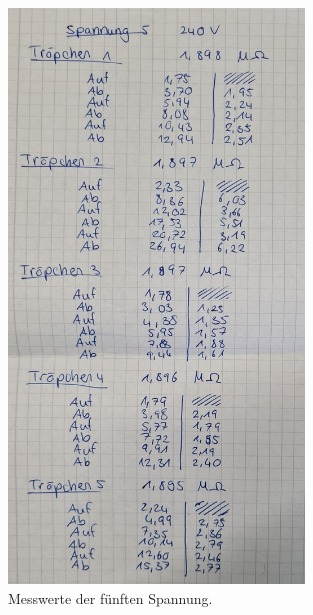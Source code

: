 \begin{figure}
    \centering
    \includegraphics[width=0.7\textwidth]{bilder/Spannung5.jpg}
    \caption{Messwerte der fünften Spannung.}
\end{figure}